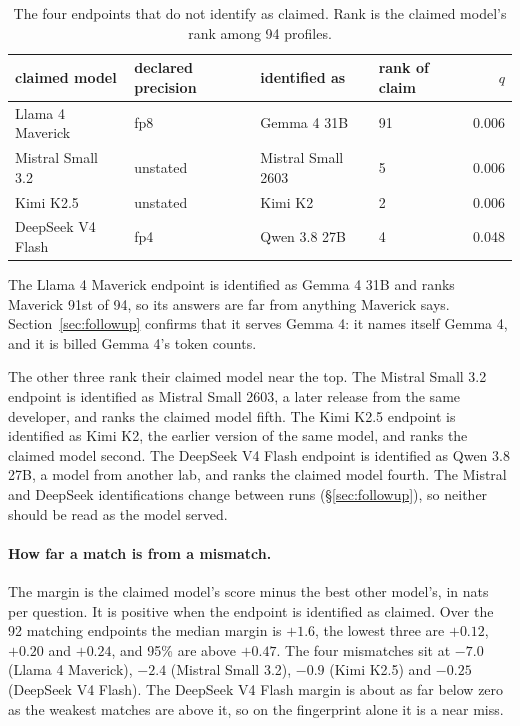 \documentclass[11pt]{article}
\begin{document}
\begin{table}[h]
\centering\small
\begin{tabular}{llllr}
\toprule
claimed model & declared precision & identified as & rank of claim & $q$ \\
\midrule
Llama 4 Maverick & fp8 & Gemma 4 31B & 91 & 0.006 \\
Mistral Small 3.2 & unstated & Mistral Small 2603 & 5 & 0.006 \\
Kimi K2.5 & unstated & Kimi K2 & 2 & 0.006 \\
DeepSeek V4 Flash & fp4 & Qwen 3.8 27B & 4 & 0.048 \\
\bottomrule
\end{tabular}
\caption{The four endpoints that do not identify as claimed. Rank is the claimed model's rank
among 94 profiles.}
\label{tab:mismatch}
\end{table}

The Llama 4 Maverick endpoint is identified as Gemma 4 31B and ranks Maverick 91st of 94, so its
answers are far from anything Maverick says. Section~\ref{sec:followup} confirms that it serves
Gemma 4: it names itself Gemma 4, and it is billed Gemma 4's token counts.

The other three rank their claimed model near the top. The Mistral Small 3.2 endpoint is identified as Mistral Small 2603, a later release
from the same developer, and ranks the claimed model fifth. The Kimi K2.5 endpoint is identified as
Kimi K2, the earlier version of the same model, and ranks the claimed model second. The DeepSeek V4
Flash endpoint is identified as Qwen 3.8 27B, a model from another lab, and ranks the claimed model
fourth. The Mistral and DeepSeek identifications change between runs (\S\ref{sec:followup}), so
neither should be read as the model served.

\paragraph{How far a match is from a mismatch.} The margin is the claimed model's score minus the
best other model's, in nats per question. It is positive when the endpoint is identified as
claimed. Over the 92 matching endpoints the median margin is $+1.6$, the lowest three are $+0.12$,
$+0.20$ and $+0.24$, and 95\% are above $+0.47$. The four mismatches sit at $-7.0$ (Llama 4
Maverick), $-2.4$ (Mistral Small 3.2), $-0.9$ (Kimi K2.5) and $-0.25$ (DeepSeek V4 Flash). The
DeepSeek V4 Flash margin is about as far below zero as the weakest matches are above it, so on the
fingerprint alone it is a near miss.
\end{document}
